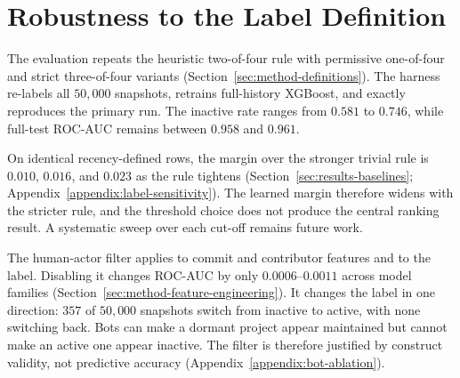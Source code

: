\section{Robustness to the Label Definition}
\label{sec:results-label-sensitivity}

The evaluation repeats the heuristic two-of-four rule with permissive one-of-four
and strict three-of-four variants (Section~\ref{sec:method-definitions}). The
harness re-labels all \(50{,}000\) snapshots, retrains full-history XGBoost, and
exactly reproduces the primary run. The inactive rate ranges from \(0.581\) to
\(0.746\), while full-test ROC-AUC remains between \(0.958\) and \(0.961\).

On identical recency-defined rows, the margin over the stronger trivial rule is
\(0.010\), \(0.016\), and \(0.023\) as the rule tightens
(Section~\ref{sec:results-baselines};
Appendix~\ref{appendix:label-sensitivity}). The learned margin therefore widens
with the stricter rule, and the threshold choice does not produce the central
ranking result. A systematic sweep over each cut-off remains future
work.

The human-actor filter applies to commit and contributor features and to the
label. Disabling it changes ROC-AUC by only
\(0.0006\)--\(0.0011\) across model families
(Section~\ref{sec:method-feature-engineering}). It changes the label in one
direction: \(357\) of \(50{,}000\) snapshots switch from inactive to active,
with none switching back. Bots can make a dormant project appear maintained but
cannot make an active one appear inactive. The filter is therefore justified by
construct validity, not predictive accuracy
(Appendix~\ref{appendix:bot-ablation}).
